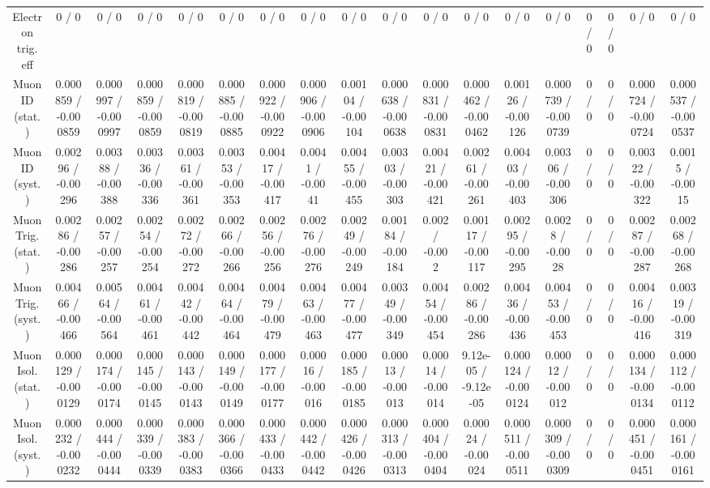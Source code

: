 \documentclass[10pt]{article}
\begin{document}
\begin{table}[htbp]
\begin{center}
\begin{tabular}{|c|c|c|c|c|c|c|c|c|c|c|c|c|c|c|c|c|c|}
  Electron trig. eff & 0 / 0 & 0 / 0 & 0 / 0 & 0 / 0 & 0 / 0 & 0 / 0 & 0 / 0 & 0 / 0 & 0 / 0 & 0 / 0 & 0 / 0 & 0 / 0 & 0 / 0 & 0 / 0 & 0 / 0 & 0 / 0 & 0 / 0 \\ 
  Muon ID (stat.) & 0.000859 / -0.000859 & 0.000997 / -0.000997 & 0.000859 / -0.000859 & 0.000819 / -0.000819 & 0.000885 / -0.000885 & 0.000922 / -0.000922 & 0.000906 / -0.000906 & 0.00104 / -0.00104 & 0.000638 / -0.000638 & 0.000831 / -0.000831 & 0.000462 / -0.000462 & 0.00126 / -0.00126 & 0.000739 / -0.000739 & 0 / 0 & 0 / 0 & 0.000724 / -0.000724 & 0.000537 / -0.000537 \\ 
  Muon ID (syst.) & 0.00296 / -0.00296 & 0.00388 / -0.00388 & 0.00336 / -0.00336 & 0.00361 / -0.00361 & 0.00353 / -0.00353 & 0.00417 / -0.00417 & 0.0041 / -0.0041 & 0.00455 / -0.00455 & 0.00303 / -0.00303 & 0.00421 / -0.00421 & 0.00261 / -0.00261 & 0.00403 / -0.00403 & 0.00306 / -0.00306 & 0 / 0 & 0 / 0 & 0.00322 / -0.00322 & 0.0015 / -0.0015 \\ 
  Muon Trig. (stat.) & 0.00286 / -0.00286 & 0.00257 / -0.00257 & 0.00254 / -0.00254 & 0.00272 / -0.00272 & 0.00266 / -0.00266 & 0.00256 / -0.00256 & 0.00276 / -0.00276 & 0.00249 / -0.00249 & 0.00184 / -0.00184 & 0.002 / -0.002 & 0.00117 / -0.00117 & 0.00295 / -0.00295 & 0.0028 / -0.0028 & 0 / 0 & 0 / 0 & 0.00287 / -0.00287 & 0.00268 / -0.00268 \\ 
  Muon Trig. (syst.) & 0.00466 / -0.00466 & 0.00564 / -0.00564 & 0.00461 / -0.00461 & 0.00442 / -0.00442 & 0.00464 / -0.00464 & 0.00479 / -0.00479 & 0.00463 / -0.00463 & 0.00477 / -0.00477 & 0.00349 / -0.00349 & 0.00454 / -0.00454 & 0.00286 / -0.00286 & 0.00436 / -0.00436 & 0.00453 / -0.00453 & 0 / 0 & 0 / 0 & 0.00416 / -0.00416 & 0.00319 / -0.00319 \\ 
  Muon Isol. (stat.) & 0.000129 / -0.000129 & 0.000174 / -0.000174 & 0.000145 / -0.000145 & 0.000143 / -0.000143 & 0.000149 / -0.000149 & 0.000177 / -0.000177 & 0.00016 / -0.00016 & 0.000185 / -0.000185 & 0.00013 / -0.00013 & 0.00014 / -0.00014 & 9.12e-05 / -9.12e-05 & 0.000124 / -0.000124 & 0.00012 / -0.00012 & 0 / 0 & 0 / 0 & 0.000134 / -0.000134 & 0.000112 / -0.000112 \\ 
  Muon Isol. (syst.) & 0.000232 / -0.000232 & 0.000444 / -0.000444 & 0.000339 / -0.000339 & 0.000383 / -0.000383 & 0.000366 / -0.000366 & 0.000433 / -0.000433 & 0.000442 / -0.000442 & 0.000426 / -0.000426 & 0.000313 / -0.000313 & 0.000404 / -0.000404 & 0.00024 / -0.00024 & 0.000511 / -0.000511 & 0.000309 / -0.000309 & 0 / 0 & 0 / 0 & 0.000451 / -0.000451 & 0.000161 / -0.000161 \\ 

\end{tabular}
\end{center}
\end{table}
\end{document}
